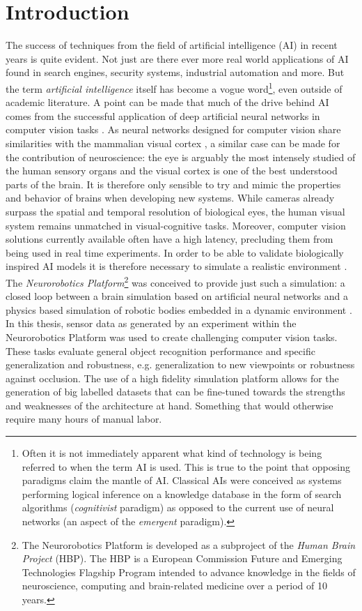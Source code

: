 \chapter{Introduction}\label{chapter:introduction}
The success of techniques from the field of artificial intelligence (AI) in recent years is quite evident. Not just are there ever more real world applications of AI found in search engines, security systems, industrial automation and more. But the term \emph{artificial intelligence} itself has become a vogue word\footnote{Often it is not immediately apparent what kind of technology is being referred to when the term AI is used. This is true to the point that opposing paradigms claim the mantle of AI. Classical AIs were conceived as systems performing logical inference on a knowledge database in the form of search algorithms (\emph{cognitivist} paradigm) as opposed to the current use of neural networks (an aspect of the \emph{emergent} paradigm).}, even outside of academic literature. A point can be made that much of the drive behind AI comes from the successful application of deep artificial neural networks in computer vision tasks \cite{paulun2018retinotopic}. As neural networks designed for computer vision share similarities with the mammalian visual cortex \cite{lecun1998gradient}, a similar case can be made for the contribution of neuroscience: the eye is arguably the most intensely studied of the human sensory organs and the visual cortex is one of the best understood parts of the brain. It is therefore only sensible to try and mimic the properties and behavior of brains when developing new systems. While cameras already surpass the spatial and temporal resolution of biological eyes, the human visual system remains unmatched in visual-cognitive tasks. Moreover, computer vision solutions currently available often have a high latency, precluding them from being used in real time experiments. In order to be able to validate biologically inspired AI models it is therefore necessary to simulate a realistic environment \cite{falotico2017connecting}. The \emph{Neurorobotics Platform}\footnote{The Neurorobotics Platform is developed as a subproject of the \emph{Human Brain Project} (HBP). The HBP is a European Commission Future and Emerging Technologies Flagship Program intended to advance knowledge in the fields of neuroscience, computing and brain-related medicine over a period of 10 years.} was conceived to provide just such a simulation: a closed loop between a brain simulation based on artificial neural networks and a physics based simulation of robotic bodies embedded in a dynamic environment \cite{knoll2017neurorobotics}. In this thesis, sensor data as generated by an experiment within the Neurorobotics Platform was used to create challenging computer vision tasks. These tasks evaluate general object recognition performance and specific generalization and robustness, e.g. generalization to new viewpoints or robustness against occlusion. The use of a high fidelity simulation platform allows for the generation of big labelled datasets that can be fine-tuned towards the strengths and weaknesses of the architecture at hand. Something that would otherwise require many hours of manual labor.

